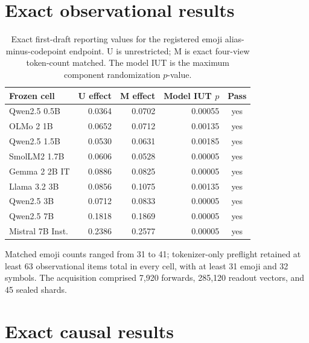 \documentclass{article}
\begin{document}
\section{Exact observational results}
\label{app:observational}

\begin{table}[H]
\centering
\small
\begin{tabular}{lrrrc}
\toprule
Frozen cell & U effect & M effect & Model IUT $p$ & Pass \\
\midrule
Qwen2.5 0.5B & 0.0364 & 0.0702 & 0.00055 & yes \\
OLMo 2 1B & 0.0652 & 0.0712 & 0.00135 & yes \\
Qwen2.5 1.5B & 0.0530 & 0.0631 & 0.00185 & yes \\
SmolLM2 1.7B & 0.0606 & 0.0528 & 0.00005 & yes \\
Gemma 2 2B IT & 0.0886 & 0.0825 & 0.00005 & yes \\
Llama 3.2 3B & 0.0856 & 0.1075 & 0.00135 & yes \\
Qwen2.5 3B & 0.0712 & 0.0833 & 0.00005 & yes \\
Qwen2.5 7B & 0.1818 & 0.1869 & 0.00005 & yes \\
Mistral 7B Inst. & 0.2386 & 0.2577 & 0.00005 & yes \\
\bottomrule
\end{tabular}
\caption{Exact first-draft reporting values for the registered emoji
alias-minus-codepoint endpoint. U is unrestricted; M is exact four-view
token-count matched. The model IUT is the maximum component randomization
$p$-value.}
\label{tab:observational}
\end{table}

Matched emoji counts ranged from 31 to 41; tokenizer-only preflight retained
at least 63 observational items total in every cell, with at least 31 emoji
and 32 symbols. The acquisition comprised 7,920 forwards, 285,120 readout
vectors, and 45 sealed shards.

\section{Exact causal results}
\label{app:causal}
\end{document}
